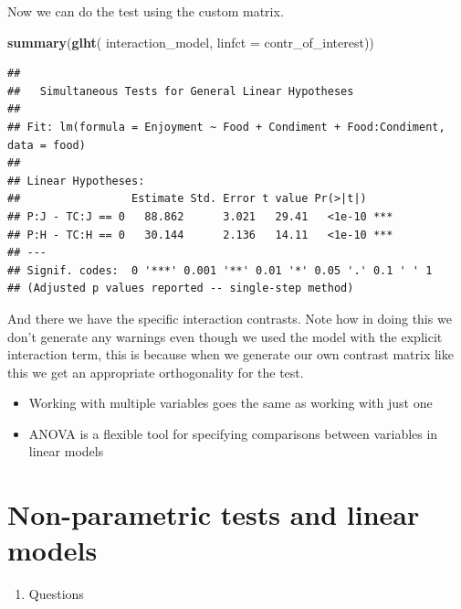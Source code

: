 \documentclass[
]{book}
\newenvironment{Shaded}{\begin{snugshade}}{\end{snugshade}}
\newcommand{\DataTypeTok}[1]{\textcolor[rgb]{0.13,0.29,0.53}{#1}}
\newcommand{\KeywordTok}[1]{\textcolor[rgb]{0.13,0.29,0.53}{\textbf{#1}}}
\newcommand{\NormalTok}[1]{#1}
\providecommand{\tightlist}{%
  \setlength{\itemsep}{0pt}\setlength{\parskip}{0pt}}
\newenvironment{task}
{ \begin{tcolorbox}[title=For you to do,title filled] }
{  \end{tcolorbox} }
\newenvironment{roundup}
{ \begin{tcolorbox}[colbacktitle=yellow!50!white,
title=Round Up,coltitle=black,
fonttitle=\bfseries] }
{  \end{tcolorbox} }
\begin{document}
Now we can do the test using the custom matrix.

\begin{Shaded}
\begin{Highlighting}[]
\KeywordTok{summary}\NormalTok{(}\KeywordTok{glht}\NormalTok{( interaction_model, }\DataTypeTok{linfct =}\NormalTok{ contr_of_interest))}
\end{Highlighting}
\end{Shaded}

\begin{verbatim}
## 
## 	 Simultaneous Tests for General Linear Hypotheses
## 
## Fit: lm(formula = Enjoyment ~ Food + Condiment + Food:Condiment, data = food)
## 
## Linear Hypotheses:
##                 Estimate Std. Error t value Pr(>|t|)    
## P:J - TC:J == 0   88.862      3.021   29.41   <1e-10 ***
## P:H - TC:H == 0   30.144      2.136   14.11   <1e-10 ***
## ---
## Signif. codes:  0 '***' 0.001 '**' 0.01 '*' 0.05 '.' 0.1 ' ' 1
## (Adjusted p values reported -- single-step method)
\end{verbatim}

And there we have the specific interaction contrasts. Note how in doing this we don't generate any warnings even though we used the model with the explicit interaction term, this is because when we generate our own contrast matrix like this we get an appropriate orthogonality for the test.

\begin{roundup}
\begin{itemize}
\tightlist
\item
  Working with multiple variables goes the same as working with just one
\item
  ANOVA is a flexible tool for specifying comparisons between variables in linear models
\end{itemize}
\end{roundup}

\begin{task}
\end{task}

\hypertarget{non-parametric-tests-and-linear-models}{%
\chapter{Non-parametric tests and linear models}\label{non-parametric-tests-and-linear-models}}

\begin{enumerate}
\def\labelenumi{\arabic{enumi}.}
\tightlist
\item
  Questions
\end{enumerate}
\end{document}
